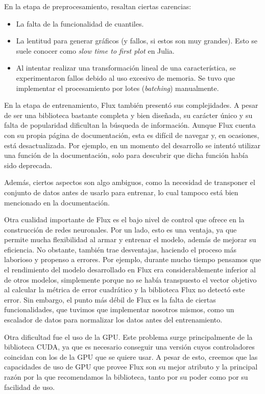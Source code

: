 \documentclass[11pt]{article}
\newcommand{\english}[1]{\textit{#1}}
\begin{document}
En la etapa de preprocesamiento, resaltan ciertas carencias:

\begin{itemize}
    \item La falta de la funcionalidad de cuantiles.
    \item La lentitud para generar gráficos (y fallos, si estos son muy grandes). Esto se suele conocer como \english{slow time to first plot} \cite{jl:ex:slow_time_first_plot} en Julia.
    \item Al intentar realizar una transformación lineal de una característica, se experimentaron fallos debido al uso excesivo de memoria. Se tuvo que implementar el procesamiento por lotes (\english{batching}) manualmente.
\end{itemize}

En la etapa de entrenamiento, Flux también presentó sus complejidades. A pesar de ser una biblioteca bastante completa y bien diseñada, su carácter único y su falta de popularidad dificultan la búsqueda de información. Aunque Flux cuenta con su propia página de documentación, esta es difícil de navegar y, en ocasiones, está desactualizada. Por ejemplo, en un momento del desarrollo se intentó utilizar una función de la documentación, solo para descubrir que dicha función había sido deprecada.

Además, ciertos aspectos son algo ambiguos, como la necesidad de transponer el conjunto de datos antes de usarlo para entrenar, lo cual tampoco está bien mencionado en la documentación.

Otra cualidad importante de Flux es el bajo nivel de control que ofrece en la construcción de redes neuronales. Por un lado, esto es una ventaja, ya que permite mucha flexibilidad al armar y entrenar el modelo, además de mejorar su eficiencia. No obstante, también trae desventajas, haciendo el proceso más laborioso y propenso a errores. Por ejemplo, durante mucho tiempo pensamos que el rendimiento del modelo desarrollado en Flux era considerablemente inferior al de otros modelos, simplemente porque no se había transpuesto el vector objetivo al calcular la métrica de error cuadrático y la biblioteca Flux no detectó este error. Sin embargo, el punto más débil de Flux es la falta de ciertas funcionalidades, que tuvimos que implementar nosotros mismos, como un escalador de datos para normalizar los datos antes del entrenamiento.

Otra dificultad fue el uso de la GPU. Este problema surge principalmente de la biblioteca CUDA, ya que es necesario conseguir una versión cuyos controladores coincidan con los de la GPU que se quiere usar. A pesar de esto, creemos que las capacidades de uso de GPU que provee Flux son su mejor atributo y la principal razón por la que recomendamos la biblioteca, tanto por su poder como por su facilidad de uso.
\end{document}
